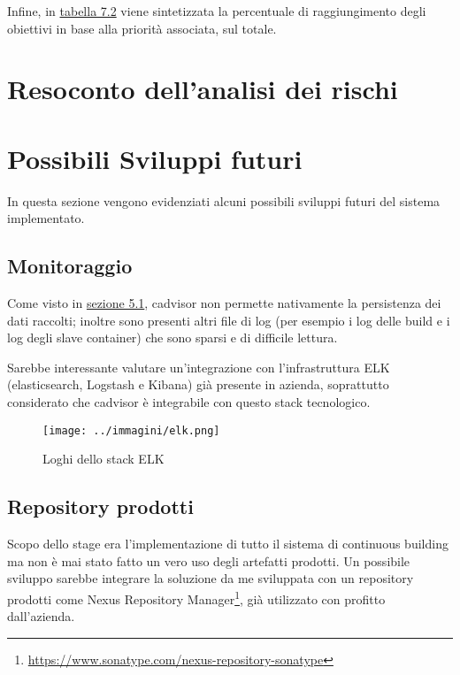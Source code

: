 

Infine, in \hyperref[tab:resume]{tabella 7.2} viene sintetizzata la percentuale di raggiungimento degli obiettivi in base alla priorità associata, sul totale.



\section{Resoconto dell'analisi dei rischi}

\section{Possibili Sviluppi futuri}

In questa sezione vengono evidenziati alcuni possibili sviluppi futuri del sistema implementato.\\

\subsection{Monitoraggio}
Come visto in \hyperref[sec:monitoring]{sezione 5.1}, cadvisor non permette nativamente la persistenza dei dati raccolti; inoltre sono presenti altri file di log (per esempio i log delle \gls{build} e i log degli \gls{slave} container) che sono sparsi e di difficile lettura. 

Sarebbe interessante valutare un'integrazione con l'infrastruttura ELK (elasticsearch, Logstash e Kibana) già presente in azienda, soprattutto considerato che cadvisor è integrabile con questo stack tecnologico.

\begin{figure}[H]
    \capstart
    \centering
    \texttt{[image: ../immagini/elk.png]}
    \caption{Loghi dello stack ELK}
\end{figure}

\subsection{Repository prodotti}

Scopo dello stage era l'implementazione di tutto il sistema di \gls{continuous building} ma non è mai stato fatto un vero uso degli artefatti prodotti. Un possibile sviluppo sarebbe integrare la soluzione da me sviluppata con un \gls{repository} prodotti come Nexus Repository Manager\footnote{\url{https://www.sonatype.com/nexus-repository-sonatype}}, già utilizzato con profitto dall'azienda.\\

